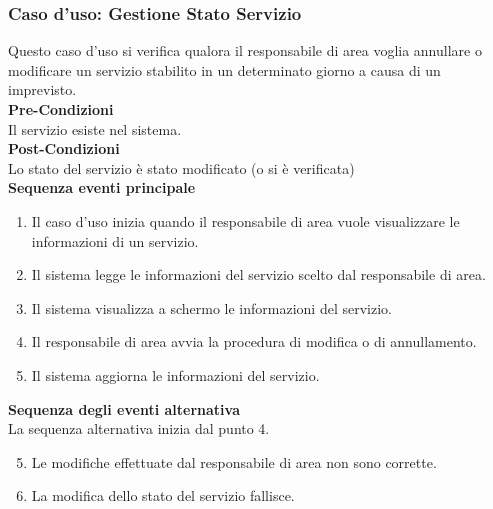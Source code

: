 \documentclass[green, fancy, 11pt]{elegantbook}
\begin{document}
\subsubsection{Caso d'uso: Gestione Stato Servizio}
\noindent
Questo caso d’uso si verifica qualora il responsabile di area voglia annullare o modificare un servizio stabilito in un determinato giorno a causa di un imprevisto.\\
\textbf{Pre-Condizioni}\\
Il servizio esiste nel sistema.\\
\textbf{Post-Condizioni}\\
Lo stato del servizio è stato modificato (o si è verificata)\\
\textbf{Sequenza eventi principale}
\begin{enumerate}
	\item Il caso d’uso inizia quando il responsabile di area vuole visualizzare le informazioni di un servizio.
	\item Il sistema legge le informazioni del servizio scelto dal responsabile di area.
	\item Il sistema visualizza a schermo le informazioni del servizio.
	\item Il responsabile di area avvia la procedura di modifica o di annullamento.
	\item Il sistema aggiorna le informazioni del servizio.
\end{enumerate}
\textbf{Sequenza degli eventi alternativa}\\
La sequenza alternativa inizia dal punto 4.
\begin{enumerate}
	\setcounter{enumi}{4}
	\item Le modifiche effettuate dal responsabile di area non sono corrette.
	\item La modifica dello stato del servizio fallisce.
\end{enumerate}
\end{document}
